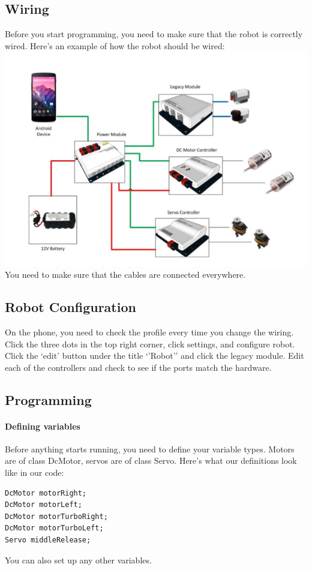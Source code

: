 \documentclass[12p,a4paper]{article}
\begin{document}
\subsection{Wiring}
Before you start programming, you need to make sure that the robot is correctly wired. Here's an example of how the robot should be wired:\\
\includegraphics[scale=0.3]{robot-wiring}\\
You need to make sure that the cables are connected everywhere.
\subsection{Robot Configuration}
On the phone, you need to check the profile every time you change the wiring. Click the three dots in the top right corner, click settings, and configure robot. Click the `edit' button under the title `'Robot'' and click the legacy module. Edit each of the controllers and check to see if the ports match the hardware.
\subsection{Programming}
\paragraph{Defining variables}Before anything starts running, you need to define your variable types. Motors are of class DcMotor, servos are of class Servo. Here's what our definitions look like in our code:
\begin{verbatim}
DcMotor motorRight;
DcMotor motorLeft;
DcMotor motorTurboRight;
DcMotor motorTurboLeft;
Servo middleRelease;
\end{verbatim}
You can also set up any other variables.
\end{document}
